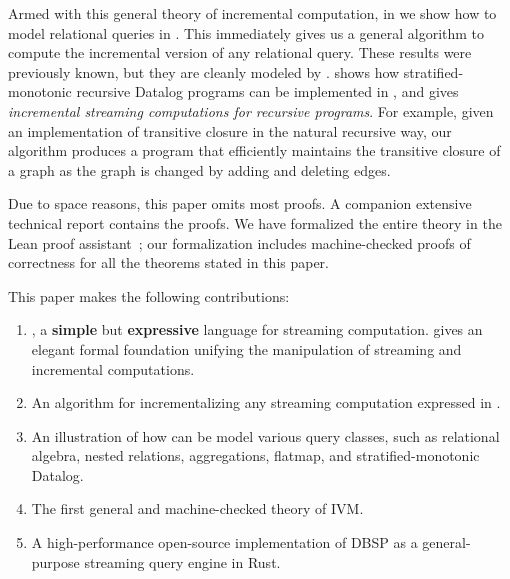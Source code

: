 Armed with this general theory of incremental computation, in   
we show how to model relational queries in \dbsp.  This immediately gives
us a general algorithm to compute the incremental version of any relational query.
These results were previously known, but they are cleanly modeled by \dbsp.  
 shows how stratified-monotonic recursive Datalog
programs can be implemented in \dbsp, and  gives 
\emph{incremental streaming computations for recursive programs}. For example, given an implementation of 
transitive closure in the natural recursive way, our algorithm produces a program that efficiently maintains the 
transitive closure of a graph as the graph is changed by adding and deleting edges.

Due to space reasons, this paper omits most proofs.  A companion extensive
technical report contains the proofs.  We have formalized the
entire \dbsp theory in the Lean proof assistant~; 
our formalization includes machine-checked proofs of correctness 
for all the theorems stated in this paper.

This paper makes the following contributions:
\begin{enumerate}[nosep, leftmargin=0pt, itemindent=0.5cm, label=\textbf{(\arabic{*})}]
  \item \dbsp, a \textbf{simple} but \textbf{expressive} language for streaming
  computation. \dbsp gives an elegant formal foundation unifying the manipulation of
  streaming and incremental computations.
  \item An algorithm for incrementalizing any streaming computation expressed in
  \dbsp.
  \item An illustration of how \dbsp can be model various query classes, such as relational algebra, 
  nested relations, aggregations, flatmap, and stratified-monotonic Datalog.
  \item The first general and machine-checked theory of IVM.
  \item A high-performance open-source implementation of DBSP as a
  general-purpose streaming query engine in Rust.
\end{enumerate}
